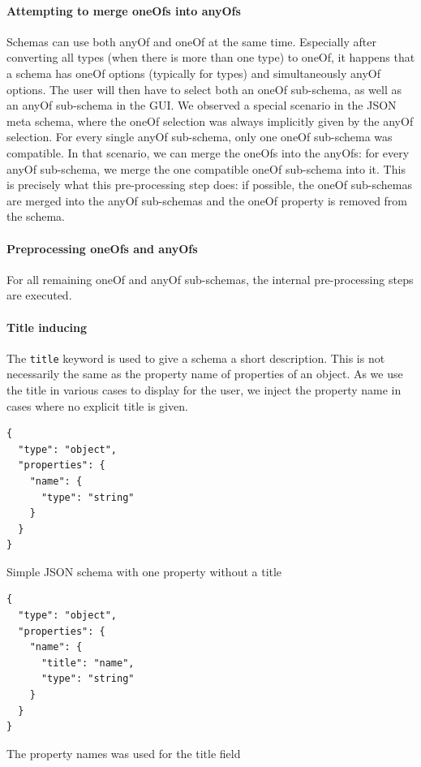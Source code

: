 \paragraph{Attempting to merge oneOfs into anyOfs}
Schemas can use both anyOf and oneOf at the same time.
Especially after converting all types (when there is more than one type) to oneOf, it happens that a schema has oneOf options (typically for types) and simultaneously anyOf options.
The user will then have to select both an oneOf sub-schema, as well as an anyOf sub-schema in the GUI.
We observed a special scenario in the JSON meta schema, where the oneOf selection was always implicitly given by the anyOf selection.
For every single anyOf sub-schema, only one oneOf sub-schema was compatible.
In that scenario, we can merge the oneOfs into the anyOfs: for every anyOf sub-schema, we merge the one compatible oneOf sub-schema into it.
This is precisely what this pre-processing step does: if possible, the oneOf sub-schemas are merged into the anyOf sub-schemas and the oneOf property is removed from the schema.


\paragraph{Preprocessing oneOfs and anyOfs}
For all remaining oneOf and anyOf sub-schemas, the internal pre-processing steps are executed.


\paragraph{Title inducing}

The \texttt{title} keyword is used to give a schema a short description.
This is not necessarily the same as the property name of properties of an object.
As we use the title in various cases to display for the user, we inject the property name in cases where no explicit title is given.

\begin{listing}[!h]
    \begin{verbatim}
{
  "type": "object",
  "properties": {
    "name": {
      "type": "string"
    }
  }
}
    \end{verbatim}
    \caption{Simple JSON schema with one property without a title}
    \label{listing:no-title}
\end{listing}

\begin{listing}[!h]
    \begin{verbatim}
{
  "type": "object",
  "properties": {
    "name": {
      "title": "name",
      "type": "string"
    }
  }
}
    \end{verbatim}
    \caption{The property names was used for the title field}
    \label{listing:with-title}
\end{listing}

